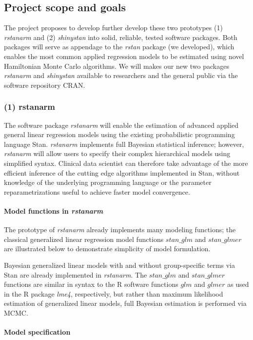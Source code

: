 \documentclass[11pt,notitlepage]{article}
\begin{document}
\subsection*{Project scope and goals }
The project proposes to develop further develop these two prototypes (1) \textit{rstanarm} and (2) \textit{shinystan} into solid, reliable, tested software packages. Both packages will serve as appendage to the \textit{rstan} package (we developed), which enables the most common applied regression models to be estimated using novel Hamiltonian Monte Carlo algorithms. We will makes our new two packages \textit{rstanarm} and \textit{shinystan} available to researchers and the general public via the software repository CRAN. 

\subsubsection*{(1) rstanarm}
The software package \textit{rstanarm} will enable the estimation of advanced applied general linear regression models using the existing probabilistic programming language Stan. \textit{rstanarm} implements full Bayesian statistical inference;  however, \textit{rstanarm} will allow users to specify their complex hierarchical models using simplified syntax. Clinical data scientist can therefore take advantage of the  more efficient inference of the cutting edge algorithms implemented in Stan, without knowledge of the underlying programming language or the parameter reparametrizations useful to achieve faster model convergence.

\paragraph*{Model functions in \textit{rstanarm}}
The prototype of \textit{rstanarm} already implements many modeling functions; the classical generalized linear regression model functions $stan\_glm$ and $stan\_glmer$ are illustrated below to demonstrate simplicity of model formulation.  

Bayesian generalized linear models with and without group-specific terms via Stan are already implemented in \textit{rstanarm}. The $stan\_glm$ and $stan\_glmer$ functions are similar in syntax to the R software functions $glm$ and $glmer$ as used in the R package \textit{lme4}, respectively, but rather than maximum likelihood estimation of generalized linear models, full Bayesian estimation is performed  via MCMC. 

\paragraph*{Model specification}
\end{document}
